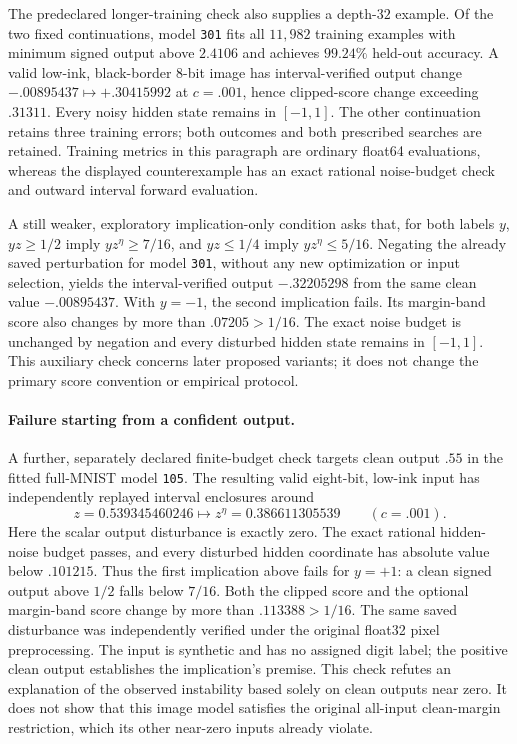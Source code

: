 The predeclared longer-training check also supplies a depth-$32$ example.  Of the two fixed continuations, model \texttt{301} fits all $11{,}982$ training examples with minimum signed output above $2.4106$ and achieves $99.24\%$ held-out accuracy.  A valid low-ink, black-border 8-bit image has interval-verified output change $-.00895437\mapsto+.30415992$ at $c=.001$, hence clipped-score change exceeding $.31311$.  Every noisy hidden state remains in $[-1,1]$.  The other continuation retains three training errors; both outcomes and both prescribed searches are retained.  Training metrics in this paragraph are ordinary float64 evaluations, whereas the displayed counterexample has an exact rational noise-budget check and outward interval forward evaluation.

A still weaker, exploratory implication-only condition asks that, for both labels $y$, $yz\ge1/2$ imply $yz^\eta\ge7/16$, and $yz\le1/4$ imply $yz^\eta\le5/16$.  Negating the already saved perturbation for model \texttt{301}, without any new optimization or input selection, yields the interval-verified output $-.32205298$ from the same clean value $-.00895437$.  With $y=-1$, the second implication fails.  Its margin-band score also changes by more than $.07205>1/16$.  The exact noise budget is unchanged by negation and every disturbed hidden state remains in $[-1,1]$.  This auxiliary check concerns later proposed variants; it does not change the primary score convention or empirical protocol.

\paragraph{Failure starting from a confident output.}
A further, separately declared finite-budget check targets clean output $.55$ in the fitted full-MNIST model \texttt{105}.  The resulting valid eight-bit, low-ink input has independently replayed interval enclosures around
\[
 z=0.539345460246\longmapsto z^\eta=0.386611305539
 \qquad(c=.001).
\]
Here the scalar output disturbance is exactly zero.  The exact rational hidden-noise budget passes, and every disturbed hidden coordinate has absolute value below $.101215$.  Thus the first implication above fails for $y=+1$: a clean signed output above $1/2$ falls below $7/16$.  Both the clipped score and the optional margin-band score change by more than $.113388>1/16$.  The same saved disturbance was independently verified under the original float32 pixel preprocessing.  The input is synthetic and has no assigned digit label; the positive clean output establishes the implication's premise.  This check refutes an explanation of the observed instability based solely on clean outputs near zero.  It does not show that this image model satisfies the original all-input clean-margin restriction, which its other near-zero inputs already violate.
